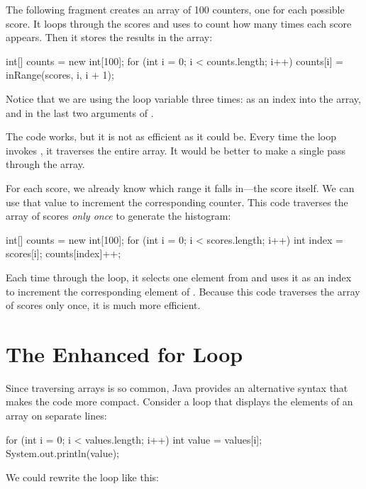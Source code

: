 The following fragment creates an array of 100 counters, one for each possible score.
It loops through the scores and uses  to count how many times each score appears.
Then it stores the results in the  array:

\begin{code}
int[] counts = new int[100];
for (int i = 0; i < counts.length; i++) {
    counts[i] = inRange(scores, i, i + 1);
}
\end{code}

Notice that we are using the loop variable  three times: as an index into the  array, and in the last two arguments of .


The code works, but it is not as efficient as it could be.
Every time the loop invokes , it traverses the entire array.
It would be better to make a single pass through the  array.

For each score, we already know which range it falls in---the score itself.
We can use that value to increment the corresponding counter.
This code traverses the array of scores {\em only once} to generate the histogram:

\begin{code}
int[] counts = new int[100];
for (int i = 0; i < scores.length; i++) {
    int index = scores[i];
    counts[index]++;
}
\end{code}

Each time through the loop, it selects one element from  and uses it as an index to increment the corresponding element of .
Because this code traverses the array of scores only once, it is much more efficient.


\section{The Enhanced for Loop}
\label{enhanced}

Since traversing arrays is so common, Java provides an alternative syntax that makes the code more compact.
Consider a  loop that displays the elements of an array on separate lines:

\begin{code}
for (int i = 0; i < values.length; i++) {
    int value = values[i];
    System.out.println(value);
}
\end{code}

We could rewrite the loop like this:

